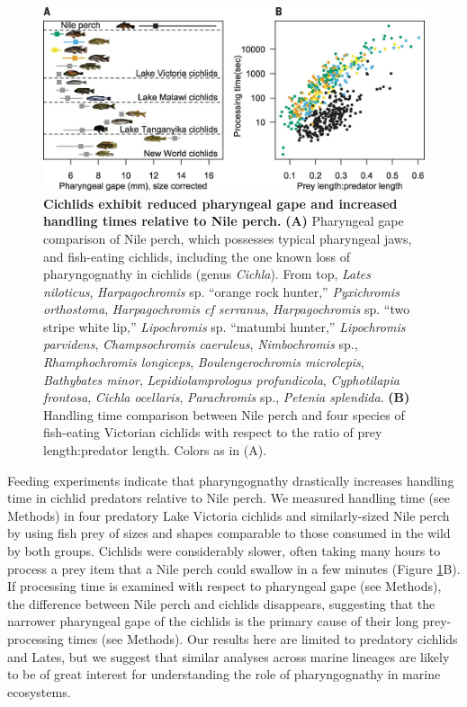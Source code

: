 \begin{figure}
    \centering
    \includegraphics[width=\textwidth]{FishJaws/figures/fig2}
    \caption{\textbf{Cichlids exhibit reduced pharyngeal gape and increased handling times relative to Nile perch.} \textbf{(A)} Pharyngeal gape comparison of Nile perch, which possesses typical pharyngeal jaws, and fish-eating cichlids, including the one known loss of pharyngognathy in cichlids (genus {\em Cichla}). From top, {\em Lates niloticus}, {\em Harpagochromis} sp. ``orange rock hunter,'' {\em Pyxichromis orthostoma}, {\em Harpagochromis cf serranus}, {\em Harpagochromis} sp. ``two stripe white lip,'' {\em Lipochromis} sp. ``matumbi hunter,'' {\em Lipochromis parvidens}, {\em Champsochromis caeruleus}, {\em Nimbochromis} sp., {\em Rhamphochromis longiceps}, {\em Boulengerochromis microlepis}, {\em Bathybates minor}, {\em Lepidiolamprologus profundicola}, {\em Cyphotilapia frontosa}, {\em Cichla ocellaris}, {\em Parachromis} sp., {\em Petenia splendida}. \textbf{(B)} Handling time comparison between Nile perch and four species of fish-eating Victorian cichlids with respect to the ratio of prey length:predator length. Colors as in (A).}
    \label{FJ_fig2}
\end{figure}

Feeding experiments indicate that pharyngognathy drastically increases handling time in cichlid predators relative to Nile perch. We measured handling time (see Methods) in four predatory Lake Victoria cichlids and similarly-sized Nile perch by using fish prey of sizes and shapes comparable to those consumed in the wild by both groups. \cite{van_oijen_ecological_1982} Cichlids were considerably slower, often taking many hours to process a prey item that a Nile perch could swallow in a few minutes (Figure \ref{FJ_fig2}B). If processing time is examined with respect to pharyngeal gape (see Methods), the difference between Nile perch and cichlids disappears, suggesting that the narrower pharyngeal gape of the cichlids is the primary cause of their long prey-processing times (see Methods). Our results here are limited to predatory cichlids and Lates, but we suggest that similar analyses across marine lineages are likely to be of great interest for understanding the role of pharyngognathy in marine ecosystems.

